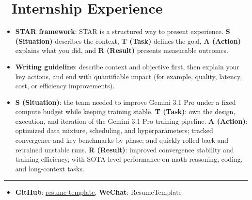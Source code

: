 \documentclass{resume}
\begin{document}
\section{\faBriefcase\ Internship Experience}
\begin{itemize}
    \item \textbf{STAR framework}: STAR is a structured way to present experience. \textbf{S (Situation)} describes the context, \textbf{T (Task)} defines the goal, \textbf{A (Action)} explains what you did, and \textbf{R (Result)} presents measurable outcomes.
    \item \textbf{Writing guideline}: describe context and objective first, then explain your key actions, and end with quantifiable impact (for example, quality, latency, cost, or efficiency improvements).
\end{itemize}

\begin{itemize}
    \item \textbf{S (Situation)}: the team needed to improve Gemini 3.1 Pro under a fixed compute budget while keeping training stable. \textbf{T (Task)}: own the design, execution, and iteration of the Gemini 3.1 Pro training pipeline. \textbf{A (Action)}: optimized data mixture, scheduling, and hyperparameters; tracked convergence and key benchmarks by phase; and quickly rolled back and retrained unstable runs. \textbf{R (Result)}: improved convergence stability and training efficiency, with SOTA-level performance on math reasoning, coding, and long-context tasks.
\end{itemize}

\hrule
\begin{itemize}[itemindent=-0.50cm]
  \item[] \textbf{GitHub}: \href{https://github.com/resume-template}{\underline{resume-template}},
          \textbf{WeChat}: ResumeTemplate
\end{itemize}
\end{document}
